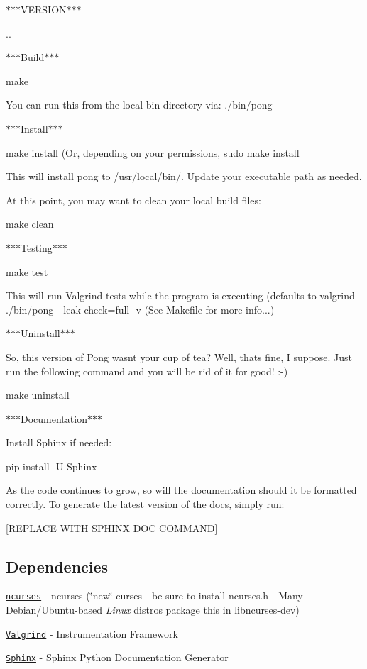 $\ast$$\ast$$\ast$\+V\+E\+R\+S\+I\+O\+N$\ast$$\ast$$\ast$

{..}

$\ast$$\ast$$\ast$\+Build$\ast$$\ast$$\ast$

{\ttfamily make}

You can run this from the local {\ttfamily bin} directory via\+: {\ttfamily ./bin/pong}

$\ast$$\ast$$\ast$\+Install$\ast$$\ast$$\ast$

{\ttfamily make install} (Or, depending on your permissions, {\ttfamily sudo make install}

This will install {\ttfamily pong} to {\ttfamily /usr/local/bin/}. Update your executable path as needed.

At this point, you may want to clean your local build files\+:

{\ttfamily make clean}

$\ast$$\ast$$\ast$\+Testing$\ast$$\ast$$\ast$

{\ttfamily make test}

This will run Valgrind tests while the program is executing (defaults to {\ttfamily valgrind ./bin/pong -\/-\/leak-\/check=full -\/v} (See {\ttfamily Makefile} for more info...)

$\ast$$\ast$$\ast$\+Uninstall$\ast$$\ast$$\ast$

So, this version of Pong wasn\textquotesingle{}t your cup of tea? Well, that\textquotesingle{}s fine, I suppose. Just run the following command and you will be rid of it for good! \+:-\/)

{\ttfamily make uninstall}

$\ast$$\ast$$\ast$\+Documentation$\ast$$\ast$$\ast$

Install {\ttfamily Sphinx} if needed\+:

{\ttfamily pip install -\/\+U Sphinx}

As the code continues to grow, so will the documentation should it be formatted correctly. To generate the latest version of the docs, simply run\+:

{\ttfamily \mbox{[}R\+E\+P\+L\+A\+C\+E W\+I\+T\+H S\+P\+H\+I\+N\+X D\+O\+C C\+O\+M\+M\+A\+N\+D\mbox{]}}

\subsection*{Dependencies}


\begin{DoxyItemize}
\item \href{https://www.gnu.org/software/ncurses/}{\tt ncurses} -\/ ncurses (\char`\"{}new\char`\"{} curses -\/ be sure to install {\ttfamily ncurses.\+h} -\/ Many Debian/\+Ubuntu-\/based {\itshape Linux} distros package this in libncurses-\/dev)
\item \href{http://valgrind.org/}{\tt Valgrind} -\/ Instrumentation Framework
\item \href{http://sphinx-doc.org/}{\tt Sphinx} -\/ Sphinx Python Documentation Generator
\end{DoxyItemize}

